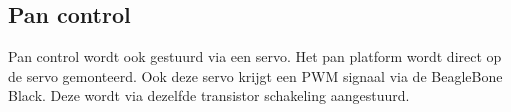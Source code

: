 \subsection{Pan control}

Pan control wordt ook gestuurd via een servo. Het pan platform wordt direct op de servo
gemonteerd. Ook deze servo krijgt een PWM signaal via de BeagleBone Black. Deze wordt
via dezelfde transistor schakeling aangestuurd.
